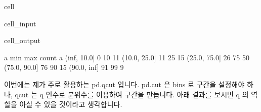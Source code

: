 \documentclass[letterpaper,10pt,english]{jupyterBook}
\begin{document}
\begin{sphinxuseclass}{cell}\begin{sphinxVerbatimInput}

\begin{sphinxuseclass}{cell_input}
\begin{sphinxVerbatim}[commandchars=\\\{\}]
  \PYG{p}{[}\PYG{p}{]} \PYG{p}{[}     \PYG{p}{]}
\PYG{p}{[}\PYG{p}{]}
\end{sphinxVerbatim}

\end{sphinxuseclass}\end{sphinxVerbatimInput}
\begin{sphinxVerbatimOutput}

\begin{sphinxuseclass}{cell_output}
\begin{sphinxVerbatim}[commandchars=\\\{\}]
               a          
             min max count
a                         
(\PYGZhy{}inf, 10.0]   0  10    11
(10.0, 25.0]  11  25    15
(25.0, 75.0]  26  75    50
(75.0, 90.0]  76  90    15
(90.0, inf]   91  99     9
\end{sphinxVerbatim}

\end{sphinxuseclass}\end{sphinxVerbatimOutput}

\end{sphinxuseclass}
\sphinxAtStartPar
이번에는 제가 주로 활용하는 pd.qcut 입니다. pd.cut 은 bins 로 구간을 설정해야 하나,
qcut 는 q 인수로 분위수를 이용하여 구간을 만듭니다. 아래 결과를 보시면 q 의 역할을 아실 수 있을 것이라고 생각합니다.
\end{document}

